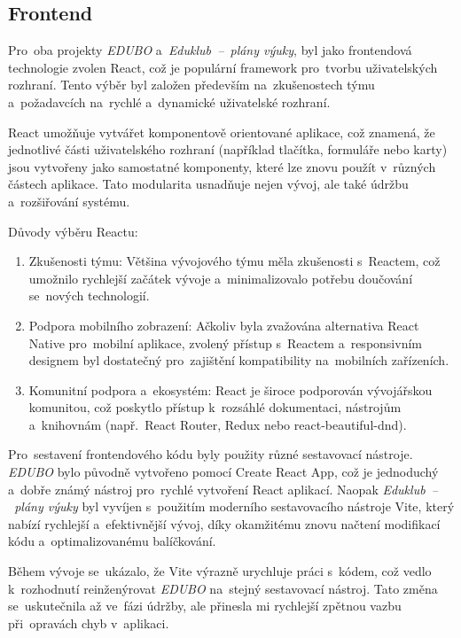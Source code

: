 \documentclass[male,czech,api_bc]{kitheses}
\begin{document}
\subsection{Frontend}

Pro~oba projekty \textit{EDUBO} a~\textit{Eduklub~--~plány výuky}, byl jako frontendová technologie zvolen React, což je populární framework pro~tvorbu uživatelských rozhraní. Tento výběr byl založen především na~zkušenostech týmu a~požadavcích na~rychlé a~dynamické uživatelské rozhraní.

React umožňuje vytvářet komponentově orientované aplikace, což znamená, že jednotlivé části uživatelského rozhraní (například tlačítka, formuláře nebo karty) jsou vytvořeny jako samostatné komponenty, které lze znovu použít v~různých částech aplikace. Tato modularita usnadňuje nejen vývoj, ale také údržbu a~rozšiřování systému.

Důvody výběru Reactu:
\begin{enumerate}
	\item Zkušenosti týmu: Většina vývojového týmu měla zkušenosti s~Reactem, což umožnilo rychlejší začátek vývoje a~minimalizovalo potřebu doučování se~nových technologií.
	\item Podpora mobilního zobrazení: Ačkoliv byla zvažována alternativa React Native pro~mobilní aplikace, zvolený přístup s~Reactem a~responsivním designem byl dostatečný pro~zajištění kompatibility na~mobilních zařízeních.
	\item Komunitní podpora a~ekosystém: React je široce podporován vývojářskou komunitou, což poskytlo přístup k~rozsáhlé dokumentaci, nástrojům a~knihovnám (např.~React Router, Redux nebo react-beautiful-dnd).
\end{enumerate}

Pro~sestavení frontendového kódu byly použity různé sestavovací nástroje. \textit{EDUBO} bylo původně vytvořeno pomocí Create React App, což je jednoduchý a~dobře známý nástroj pro~rychlé vytvoření React aplikací. Naopak \textit{Eduklub~--~plány výuky} byl vyvíjen s~použitím moderního sestavovacího nástroje Vite, který nabízí rychlejší a~efektivnější vývoj, díky okamžitému znovu načtení modifikací kódu a~optimalizovanému balíčkování.

Během vývoje se~ukázalo, že Vite výrazně urychluje práci s~kódem, což vedlo k~rozhodnutí reinženýrovat \textit{EDUBO} na~stejný sestavovací nástroj. Tato změna se~uskutečnila až ve~fázi údržby, ale přinesla mi rychlejší zpětnou vazbu při~opravách chyb v~aplikaci.
\end{document}

